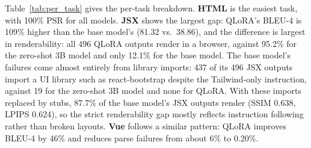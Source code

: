 \documentclass[conference,a4paper]{IEEEtran}
\begin{document}
  
\begin{table}[t]
\centering
\caption{Per-task performance for selected metrics.}
\label{tab:per_task}
\footnotesize


\end{table}
Table~\ref{tab:per_task} gives the per-task breakdown. \textbf{HTML} is the easiest task, with 100\% PSR for all models. \textbf{JSX} shows the largest gap: QLoRA's BLEU-4 is 109\% higher than the base model's (81.32 vs.\ 38.86), and the difference is largest in renderability: all 496 QLoRA outputs render in a browser, against 95.2\% for the zero-shot 3B model and only 12.1\% for the base model. The base model's failures come almost entirely from library imports: 437 of its 496 JSX outputs import a UI library such as react-bootstrap despite the Tailwind-only instruction, against 19 for the zero-shot 3B model and none for QLoRA. With these imports replaced by stubs, 87.7\% of the base model's JSX outputs render (SSIM 0.638, LPIPS 0.624), so the strict renderability gap mostly reflects instruction following rather than broken layouts. \textbf{Vue} follows a similar pattern: QLoRA improves BLEU-4 by 46\% and reduces parse failures from about 6\% to 0.20\%.
\end{document}
